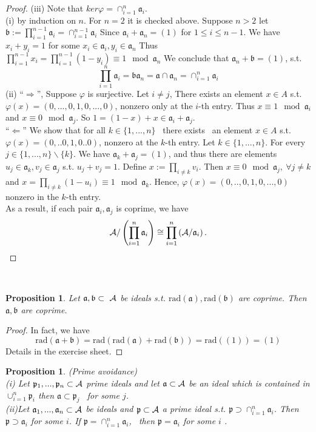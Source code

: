\documentclass[11pt]{article}
\newtheorem{prop}[thm]{Proposition}
\newcommand{\sca}{{\mathfrak a}}
\newcommand{\scb}{{\mathfrak b}}
\newcommand{\scp}{{\mathfrak p}}
\newcommand{\cala}{{\cal A}}
\begin{document}
\begin{proof}
(iii) Note that $ker \varphi =\cap^n_{i=1}\sca_i$.\\
(i) by induction on $n$.
For $n=2$ it is checked above. Suppose $n>2$ let $\scb:=\prod_{i=1}^{n-1}\sca_i=\cap^{n-1}_{i=1}\sca_i$
Since $\sca_i+\sca_n=(1)$ for $1\leq i\leq n-1$. We have $x_i+y_i=1$ for some $x_i\in \sca_i, y_i\in \sca_n$
Thus $\prod_{i=1}^{n-1}x_i= \prod_{i=1}^{n-1}(1-y_i) \equiv 1 \mod \sca_n$
We conclude that $\sca_n+\scb=(1)$, s.t. 
$$
\prod^n_{i=1}\sca_i=\scb \sca_n=\sca\cap \sca_n=\cap_{i=1}^n\sca_i
$$
(ii) ``$\Longrightarrow$'', Suppose $\varphi $ is surjective. Let $i\neq j$, There exists an element $x\in A$ s.t. $\varphi(x)=(0,...,0,1,0,...,0)$, nonzero only at the $i$-th entry.
Thus $x\equiv  1 \mod \sca_i$ and $x\equiv 0\mod \sca_j$.
So $1=(1-x)+x\in \sca_i+\sca_j$.\\
``$\Longleftarrow$'' We show that for all $k\in \{1,...,n\}$
 there exists  an element $x\in A$ s.t. $\varphi(x)=(0,..0,1,0..0)$, nonzero at the $k$-th entry.
Let $k\in \{1,...,n\}$. For every $j\in \{1,...,n\}\backslash\{k\}$.
We have $\sca_k+\sca_j=(1)$, and thus there are elements $u_j\in\sca_k,v_j\in \sca_j$
s.t. $u_j+v_j=1$.
Define $x:=\prod_{i\neq k}v_i$. Then $x\equiv 0 \mod \sca_j,\ \forall j\neq k$ and $x=\prod_{i\neq k}(1-u_i)\equiv 1\mod \sca_k$.
Hence, $\varphi(x)=(0,..,0,1,0,...,0)$ nonzero in the $k$-th entry.\\
As a result, if each pair $\sca_i,\sca_j$ is coprime, we have 
$$
\cala/\left(\prod_{i=1}^n\sca_i\right)\cong \prod_{i=1}^n\left(\cala/\sca_i\right).
$$
\end{proof}

 
\begin{prop}
Let $\sca,\scb\subset  \cala$ be ideals s.t. $\text{rad}(\sca),\text{rad}(\scb)$ are coprime. Then $\sca, \scb$ are coprime.
\end{prop}
\begin{proof}
In fact, we have
$$
 \text{rad}(\sca+\scb)=\text{rad}(\text{rad}(\sca)+\text{rad}(\scb))=\text{rad}((1))=(1)
$$
Details in the exercise sheet.
\end{proof}

\begin{prop}\label{prop:prime_avoidance}(Prime avoidance) \\
(i) Let $\scp_1,..., \scp_n\subset \cala$ prime ideals and let $\sca \subset \cala$ be an ideal which is contained in $\cup_{i=1}^n\scp_i$ then $\sca\subset \scp_j$  for some $j$.\\
(ii)Let $\sca_1,...,\sca_n\subset \cala$ be ideals and $\scp \subset \cala$ a prime ideal s.t. $\scp \supset \cap_{i=1}^n\sca_i$.
Then $\scp\supset \sca_i$ for some $i$.
If $\scp=\cap_{i=1}^n\sca_i$,  then $\scp =\sca_i $ for some $i$ .
\end{prop}
\end{document}
